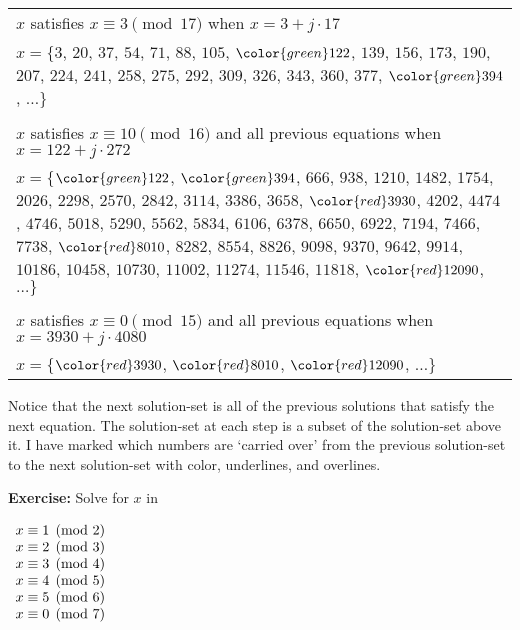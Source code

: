 \begin{longtable}[t]{p{7in}}
\(x\) satisfies \(x \equiv 3 \pmod {17}\) when \(x = 3 + j \cdot 17\)\\
\(x = \{\)\(3\), \(20\), \(37\), \(54\), \(71\), \(88\), \(105\), \(\color{green}122\), \(139\), \(156\), \(173\), \(190\), \(207\), \(224\), \(241\), \(258\), \(275\), \(292\), \(309\), \(326\), \(343\), \(360\), \(377\), \(\color{green} 394\), \(\dots\}\) \\
\\ \(x\) satisfies \(x \equiv 10 \pmod {16}\) and all previous equations
when \(x = 122 + j \cdot 272\) \\
\(x = \{\)\(\color{green}122\), \(\color{green}394\), \(666\), \(938\), \(1210\), \(1482\), \(1754\), \(2026\), \(2298\), \(2570\), \(2842\), \(3114\), \(3386\), \(3658\), \(\color{red}3930\), \(4202\), \(4474\), \(4746\), \(5018\), \(5290\), \(5562\), \(5834\), \(6106\), \(6378\), \(6650\), \(6922\), \(7194\), \(7466\), \(7738\), \(\color{red}8010\), \(8282\), \(8554\), \(8826\), \(9098\), \(9370\), \(9642\), \(9914\), \(10186\), \(10458\), \(10730\), \(11002\), \(11274\), \(11546\), \(11818\), \(\color{red}12090\), \(\dots\}\) \\
\\ \(x\) satisfies \(x \equiv 0 \pmod {15}\) and all previous equations when \(x = 3930 + j \cdot 4080\) \\
\(x = \{\)\(\color{red}3930\), \(\color{red}8010\), \(\color{red}12090\), \(\dots\}\) \\
\end{longtable}

Notice that the next solution-set is all of the previous solutions that satisfy the next equation. The solution-set at each step is a subset of the solution-set above it. I have marked which numbers are `carried over' from the previous solution-set to the next solution-set with color,  underlines, and overlines.

\item \textbf{Exercise:} Solve for \(x\) in

\(
\begin{array}[t]{l}
x \equiv 1 \pmod 2 \\
x \equiv 2 \pmod 3 \\
x \equiv 3 \pmod 4 \\
x \equiv 4 \pmod 5 \\
x \equiv 5 \pmod 6 \\
x \equiv 0 \pmod 7 \\
\end{array}
\)

